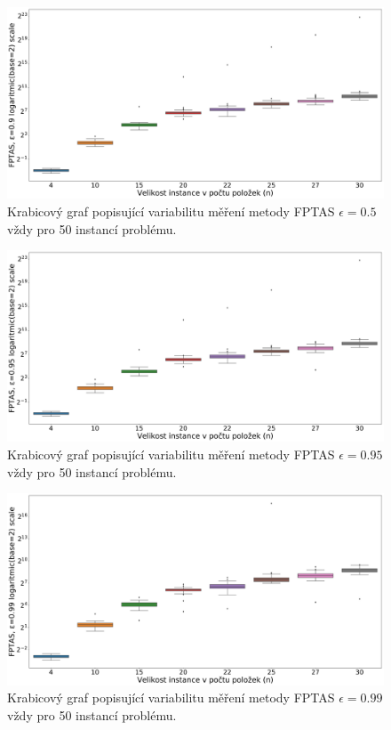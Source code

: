 \documentclass[11pt]{article}
\begin{document}
 \begin{figure}[h]\centering
	\includegraphics[scale=0.2]{img/boxF50}
 	\caption[2]{Krabicový graf popisující variabilitu měření metody FPTAS $\epsilon = 0.5$ vždy pro 50 instancí problému.}\label{fig:11}
 \end{figure} 	
 \begin{figure}[h]\centering
	\includegraphics[scale=0.2]{img/boxF95}
 	\caption[2]{Krabicový graf popisující variabilitu měření metody FPTAS $\epsilon = 0.95$ vždy pro 50 instancí problému.}\label{fig:10}
 \end{figure} 	
 \begin{figure}[h]\centering
	\includegraphics[scale=0.2]{img/boxF99}
 	\caption[2]{Krabicový graf popisující variabilitu měření metody FPTAS $\epsilon = 0.99$ vždy pro 50 instancí problému.}\label{fig:12}
 \end{figure} 	
\end{document}
